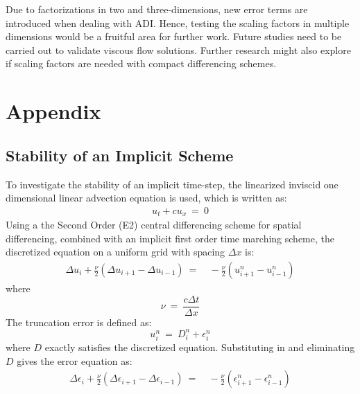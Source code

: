 \documentclass[conf]{new-aiaa}
\begin{document}
Due to factorizations in two and three-dimensions, new error terms are introduced when dealing with ADI. 
Hence, testing the scaling factors in multiple dimensions would be a fruitful area for further work. 
Future studies need to be carried out to validate viscous flow solutions. 
Further research might also explore if scaling factors are needed with compact differencing schemes. 

\section{Appendix}
\subsection{Stability of an Implicit Scheme}
{
{\label{Sec:Appendix:Stability_Fourier}
To investigate the stability of an implicit time-step, the linearized inviscid one dimensional linear advection equation is used, which is written as:
\begin{equation}
	\begin{split}
		\label{eq:LAE_Simple_Version}
  			u_t+cu_x~=~0
	\end{split}
\end{equation}
Using a the Second Order (E2) central differencing scheme for spatial differencing, combined with an implicit first order time marching scheme, the discretized equation on a uniform grid with spacing $\Delta{x}$ is:
\begin{equation}
	\begin{split}
		\label{eq:LAE_RDRP}
  			\Delta{u_i}+\frac{\nu}{2}\left(\Delta{u_{i+1}}-\Delta{u_{i-1}}\right) ~=&~-\frac{\nu}{2}\left(u^n_{i+1}-u^n_{i-1}\right)
	\end{split}
\end{equation}
where
\begin{equation*}
	\nu~=~\frac{c\Delta{t}}{\Delta{x}}
\end{equation*}
The truncation error is defined as:
\begin{equation*}
	u_i^n~=~D_i^n+\epsilon_i^n
\end{equation*}
where $D$ exactly satisfies the discretized equation. Substituting in and eliminating $D$ gives the error equation as:
\begin{equation}
	\begin{split}
		\label{eq:Error_Equation}
  			\Delta{\epsilon_i}+\frac{\nu}{2}\left(\Delta{\epsilon_{i+1}}-\Delta{\epsilon_{i-1}}\right) ~=&~-\frac{\nu}{2}\left(\epsilon^n_{i+1}-\epsilon^n_{i-1}\right)

\end{split}
\end{equation}}}
\end{document}
